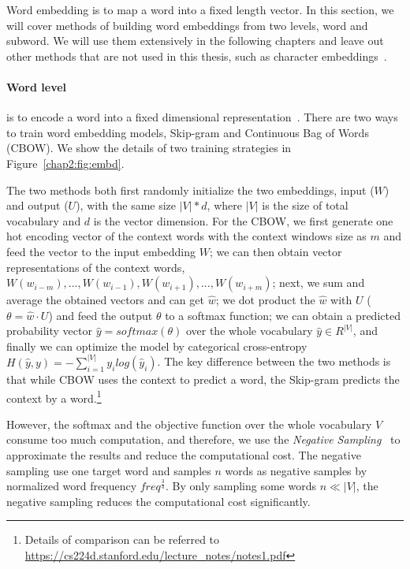Word embedding is to map a word into a fixed length vector. 
In this section, we will cover methods of building word embeddings from two levels, word and subword. 
We will use them extensively in the following chapters and leave out other methods that are not used in this thesis, such as character embeddings~\cite{zhang2015character}.

\paragraph{Word level} is to encode a word into a fixed dimensional representation~\cite{mikolov2013distributed, pennington2014glove}. 
There are two ways to train word embedding models, Skip-gram and Continuous Bag of Words (CBOW).
We show the details of two training strategies in Figure~\ref{chap2:fig:embd}.

The two methods both first randomly initialize the two embeddings, input ($W$) and output ($U$), with the same size $|V| * d$, where $|V|$ is the size of total vocabulary and $d$ is the vector dimension.
For the CBOW, we first generate one hot encoding vector of the context words with the context windows size as $m$ and feed the vector to the input embedding $W$; we can then obtain vector representations of the context words, $W(w_{i-m}), ..., W(w_{i-1}), W(w_{i+1}), ..., W(w_{i+m})$; next, we sum and average the obtained vectors and can get $\hat{w}$; we dot product the $\hat{w}$ with $U$ ($\theta = \hat{w} \cdot U $) and feed the output $\theta$ to a softmax function; we can obtain a predicted probability vector $\hat{y} = softmax(\theta)$ over the whole vocabulary $\hat{y} \in R^{|V|}$, and finally we can optimize the model by categorical cross-entropy $H(\hat{y}, y) = -\sum^{|V|}_{i=1}y_ilog(\hat{y}_i)$.
The key difference between the two methods is that while CBOW uses the context to predict a word, the Skip-gram predicts the context by a word.\footnote{Details of comparison can be referred to \url{https://cs224d.stanford.edu/lecture_notes/notes1.pdf}}

However, the softmax and the objective function over the whole vocabulary $V$ consume too much computation, and therefore, we use the \textit{Negative Sampling}~\cite{mikolov2013distributed} to approximate the results and reduce the computational cost.
The negative sampling use one target word and samples $n$ words as negative samples by normalized word frequency $freq^{\frac{3}{4}}$.
By only sampling some words $n \ll |V|$, the negative sampling reduces the computational cost significantly.


